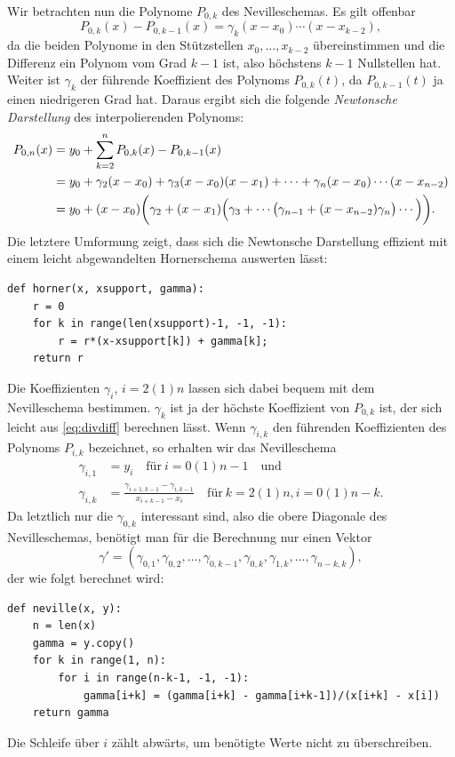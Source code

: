 Wir betrachten nun die Polynome $P_{0,k}$ des Nevilleschemas. Es gilt
offenbar
\begin{equation}
  P_{0,k}(x) - P_{0,k-1}(x) = \gamma_k(x-x_0)\cdots(x-x_{k-2}),
\end{equation}
da die beiden Polynome in den Stützstellen $x_0,\ldots,x_{k-2}$
übereinstimmen und die Differenz ein Polynom vom Grad $k-1$ ist, also
höchstens $k-1$ Nullstellen hat. Weiter ist $\gamma_k$ der führende
Koeffizient des Polynoms $P_{0,k}(t)$, da $P_{0,k-1}(t)$ ja einen
niedrigeren Grad hat. Daraus ergibt sich die folgende \emph{Newtonsche
  Darstellung} des interpolierenden Polynoms:
\begin{equation}
  \begin{split}
    P_{0,n}(x) &= y_0 + \sum_{k=2}^{n} P_{0,k}(x) - P_{0,k-1}(x)\\
    &= y_0 + \gamma_2(x-x_0) + \gamma_3(x-x_0)(x-x_1) + \cdots
    + \gamma_n(x-x_0)\cdots(x-x_{n-2})\\
    &= y_0 + (x-x_0)\biggl(\gamma_2 + (x-x_1)\Bigl(\gamma_3 + \cdots
    \bigl(\gamma_{n-1} + (x-x_{n-2})\gamma_n\bigr)\cdots\Bigr)\biggr).
  \end{split}
\end{equation}
Die letztere Umformung zeigt, dass sich die Newtonsche Darstellung
effizient mit einem leicht abgewandelten Hornerschema auswerten lässt:
\begin{lstlisting}
def horner(x, xsupport, gamma):
    r = 0
    for k in range(len(xsupport)-1, -1, -1):
        r = r*(x-xsupport[k]) + gamma[k];
    return r
\end{lstlisting}

Die Koeffizienten $\gamma_i$, $i=2(1)n$ lassen sich dabei bequem mit
dem Nevilleschema bestimmen. $\gamma_k$ ist ja der höchste Koeffizient
von $P_{0,k}$ ist, der sich leicht aus \eqref{eq:divdiff} berechnen
lässt. Wenn $\gamma_{i,k}$ den führenden Koeffizienten des Polynoms
$P_{i,k}$ bezeichnet, so erhalten wir das Nevilleschema
\begin{align}
  \gamma_{i,1} &= y_i \quad\text{für}~ i=0(1)n-1\quad\text{und}\\
  \gamma_{i,k}&= \frac{\gamma_{i+1,k-1} - \gamma_{i,k-1}}{x_{i+k-1} -
    x_i}
  \quad\text{für}~ k=2(1)n, i=0(1)n-k.
\end{align}
Da letztlich nur die $\gamma_{0,k}$ interessant sind, also die obere
Diagonale des Nevilleschemas, benötigt man für die Berechnung nur
einen Vektor
\begin{equation}
  \gamma' = \left(\gamma_{0,1},\gamma_{0,2},\ldots,\gamma_{0,k-1},
    \gamma_{0,k},\gamma_{1,k},\ldots,\gamma_{n-k,k}\right),
\end{equation}
der wie folgt berechnet wird:
\begin{lstlisting}
def neville(x, y):
    n = len(x)
    gamma = y.copy()
    for k in range(1, n):
        for i in range(n-k-1, -1, -1):
            gamma[i+k] = (gamma[i+k] - gamma[i+k-1])/(x[i+k] - x[i])
    return gamma
\end{lstlisting}
Die Schleife über $i$ zählt abwärts, um benötigte Werte nicht zu
überschreiben.

